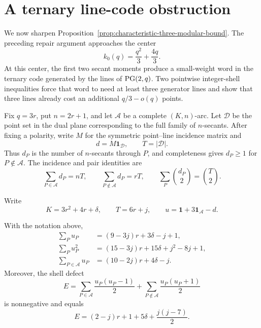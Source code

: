 \section{A ternary line-code obstruction}\label{sec:line-code-obstruction}

We now sharpen Proposition~\ref{prop:characteristic-three-modular-bound}.
The preceding repair argument approaches the center
\[
 k_0(q)=\frac{q^2}{3}+\frac{4q}{3}.
\]
At this center, the first two secant moments produce a small-weight word in
the ternary code generated by the lines of \(\mathrm{PG}(2,q)\).  Two pointwise
integer-shell inequalities force that word to need at least three generator
lines and show that three lines already cost an additional \(q/3-o(q)\)
points.

Fix \(q=3r\), put \(n=2r+1\), and let \(\mathcal A\) be a complete
\((K,n)\)-arc.  Let \(\mathcal D\) be the point set in the dual plane
corresponding to the full family of \(n\)-secants.  After fixing a polarity,
write \(M\) for the symmetric point--line incidence matrix and
\[
 d=M\mathbf 1_{\mathcal D},\qquad T=|\mathcal D|.
\]
Thus \(d_P\) is the number of \(n\)-secants through \(P\), and completeness
gives \(d_P\ge1\) for \(P\notin\mathcal A\).  The incidence and pair
identities are
\begin{equation}\label{eq:line-code-degree-moments}
 \sum_{P\in\mathcal A}d_P=nT,\qquad
 \sum_{P\notin\mathcal A}d_P=rT,\qquad
 \sum_P\binom{d_P}{2}=\binom T2.
\end{equation}

Write
\begin{equation}\label{eq:line-code-offsets}
 K=3r^2+4r+\delta,\qquad T=6r+j,\qquad
 u=\mathbf1+3\mathbf1_{\mathcal A}-d.
\end{equation}

\begin{lemma}\label{lem:centered-moment-identities}
With the notation above,
\begin{align}
 \sum_Pu_P&=(9-3j)r+3\delta-j+1,
 \label{eq:centered-sum}\\
 \sum_Pu_P^2&=(15-3j)r+15\delta+j^2-8j+1,
 \label{eq:centered-norm}\\
 \sum_{P\in\mathcal A}u_P&=(10-2j)r+4\delta-j.
 \label{eq:centered-internal-sum}
\end{align}
Moreover, the shell defect
\begin{equation}\label{eq:shell-defect-definition}
 E=\sum_{P\in\mathcal A}\frac{u_P(u_P-1)}2
   +\sum_{P\notin\mathcal A}\frac{u_P(u_P+1)}2
\end{equation}
is nonnegative and equals
\begin{equation}\label{eq:shell-defect}
 E=(2-j)r+1+5\delta+\frac{j(j-7)}2.
\end{equation}
\end{lemma}

